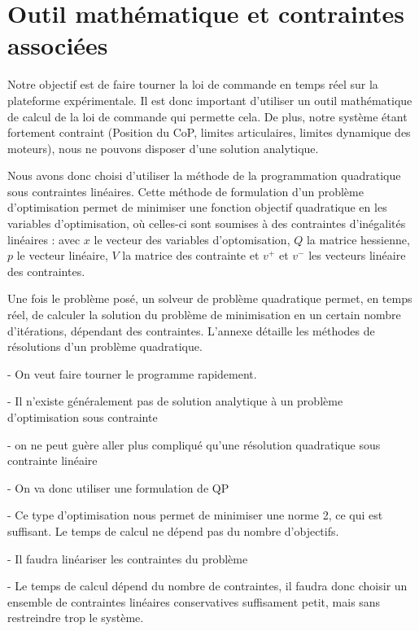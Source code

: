 	\section{Outil mathématique et contraintes associées}
	
		Notre objectif est de faire tourner la loi de commande en temps réel sur la plateforme expérimentale. 
		Il est donc important d'utiliser un outil mathématique de calcul de la loi de commande qui permette cela.
		De plus, notre système étant fortement contraint (Position du CoP, limites articulaires, limites dynamique des moteurs), nous ne pouvons disposer d'une solution analytique.
		
		Nous avons donc choisi d'utiliser la méthode de la programmation quadratique sous contraintes linéaires.
		Cette méthode de formulation d'un problème d'optimisation permet de minimiser une fonction objectif quadratique en les variables d'optimisation, où celles-ci sont soumises à des contraintes d'inégalités linéaires :
		avec $x$ le vecteur des variables d'optomisation, $Q$ la matrice hessienne, $p$ le vecteur linéaire, $V$ la matrice des contrainte et $v^+$ et $v^-$ les vecteurs linéaire des contraintes.
		
		Une fois le problème posé, un solveur de problème quadratique permet, en temps réel, de calculer la solution du problème de minimisation en un certain nombre d'itérations, dépendant des contraintes.
		L’annexe  détaille les méthodes de résolutions d'un problème quadratique.
		\newpage\newpage
		
		


			- On veut faire tourner le programme rapidement.

			- Il n'existe généralement pas de solution analytique à un problème d'optimisation sous contrainte

			- on ne peut guère aller plus compliqué qu'une résolution quadratique sous contrainte linéaire

			- On va donc utiliser une formulation de QP

			- Ce type d'optimisation nous permet de minimiser une norme 2, ce qui est suffisant. Le temps de calcul ne dépend pas du nombre d'objectifs.

			- Il faudra linéariser les contraintes du problème

			- Le temps de calcul dépend du nombre de contraintes, il faudra donc choisir un ensemble de contraintes linéaires conservatives suffisament petit, mais sans restreindre trop le système.

